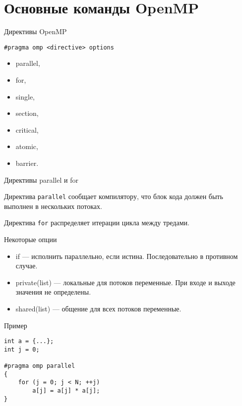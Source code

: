 \section{Основные команды OpenMP}

\begin{frame}[fragile]{Директивы OpenMP}

\begin{lstlisting}
#pragma omp <directive> options
\end{lstlisting}

\begin{itemize}
    \item parallel,
    \item for,
    \item single,
    \item section,
    \item critical,
    \item atomic,
    \item barrier.
\end{itemize}

\end{frame}

\begin{frame}[fragile]{Директивы parallel и for}

Директива \texttt{parallel} сообщает компилятору, что блок кода должен быть выполнен в нескольких потоках.

Директива \texttt{for} распределяет итерации цикла между тредами.

\end{frame}

\begin{frame}{Некоторые опции}

\begin{itemize}
    \item if --- исполнить параллельно, если истина. Последовательно в противном случае.
    \item private(list) --- локальные для потоков переменные. При входе и выходе значения не определены.
    \item shared(list) --- общение для всех потоков переменные.
\end{itemize}

\end{frame}

\begin{frame}[fragile]{Пример}

\begin{lstlisting}
int a = {...};
int j = 0;

#pragma omp parallel
{
    for (j = 0; j < N; ++j)
        a[j] = a[j] * a[j];
}
\end{lstlisting}

\end{frame}

